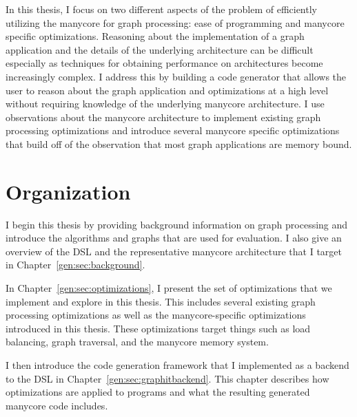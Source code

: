 In this thesis, I focus on two different aspects of the problem of efficiently utilizing the manycore for graph processing: ease of programming and manycore specific optimizations. 
Reasoning about the implementation of a graph application and the details of the underlying architecture can be difficult especially as techniques for obtaining performance on architectures become increasingly complex. 
I address this by building a code generator that allows the user to reason about the graph application and optimizations at a high level without requiring knowledge of the underlying manycore architecture.
I use observations about the manycore architecture to implement existing graph processing optimizations and introduce several manycore specific optimizations that build off of the observation that most graph applications are memory bound. 


\section{Organization}

I begin this thesis by providing background information on graph processing and introduce the algorithms and graphs that are used for evaluation.
I also give an overview of the \graphit DSL and the representative manycore architecture that I target in Chapter~\ref{gen:sec:background}.

In Chapter~\ref{gen:sec:optimizations}, I present the set of optimizations that we implement and explore in this thesis.
This includes several existing graph processing optimizations as well as the manycore-specific optimizations introduced in this thesis.
These optimizations target things such as load balancing, graph traversal, and the manycore memory system. 

I then introduce the code generation framework that I implemented as a backend to the \graphit DSL in Chapter~\ref{gen:sec:graphitbackend}.
This chapter describes how optimizations are applied to programs and what the resulting generated manycore code includes.

